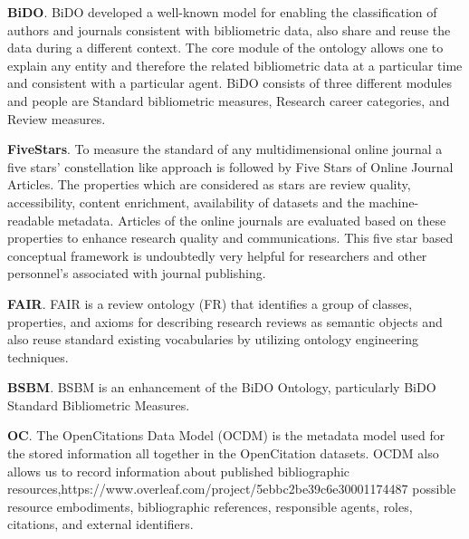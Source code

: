\medskip
\noindent \textbf{BiDO}. BiDO\cite{tapia2019extension} developed a well-known model for enabling the classification of authors and journals consistent with bibliometric data, also share and reuse the data during a different context. The core module of the ontology allows one to explain any entity and therefore the related bibliometric data at a particular time and consistent with a particular agent. BiDO consists of three different modules and people are Standard bibliometric measures, Research career categories, and Review measures.

\medskip
\noindent \textbf{FiveStars}. To measure the standard of any multidimensional online journal a five stars' constellation like approach is followed by Five Stars of Online Journal Articles. The properties which are considered as stars are review quality, accessibility, content enrichment, availability of datasets and the machine-readable metadata. Articles of the online journals are evaluated based on these properties to enhance research quality and communications. This five star based conceptual framework is undoubtedly very helpful for researchers and other personnel's associated with journal publishing.\cite{DBLP:journals/dlib/Shotton12}

\medskip
\noindent \textbf{FAIR}.  FAIR \cite{Fair} is a review ontology (FR) that identifies a group of classes, properties, and axioms for describing research reviews as semantic objects and also reuse standard existing vocabularies by utilizing ontology engineering techniques.


\medskip
\noindent \textbf{BSBM}. BSBM\cite{tapia2019extension} is an enhancement of the BiDO Ontology, particularly BiDO Standard Bibliometric Measures.


\medskip
\noindent \textbf{OC}. The OpenCitations Data Model (OCDM)\cite{DBLP:journals/corr/abs-1906-11964} is the metadata model used for the stored information all together in the OpenCitation datasets. OCDM also allows us to record information about published bibliographic resources,https://www.overleaf.com/project/5ebbc2be39c6e30001174487 possible resource embodiments, bibliographic references, responsible agents, roles, citations, and external identifiers.


\medskip

